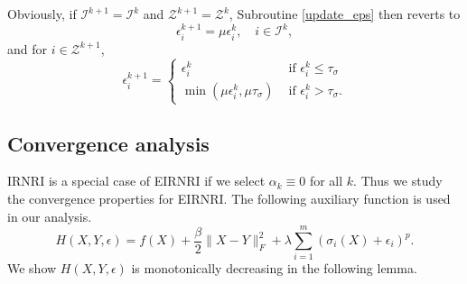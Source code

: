 \documentclass[twoside,11pt]{article}
\newcommand{\Ical}{\mathcal{I}}
\newcommand{\Zcal}{\mathcal{Z}}
\numberwithin{equation}{section}
\begin{document}
Obviously, if $\Ical^{k+1} = \Ical^k $ and $  \Zcal^{k+1} = \Zcal^k $, 
   Subroutine \eqref{update_eps} then reverts to 
    \begin{equation} \label{update.reverts1} 
     \epsilon_{i}^{k+1} = \mu \epsilon_i^k, \quad  i \in \Ical^k, 
     \end{equation} 
     and for $i\in \Zcal^{k+1}$,    
      \begin{equation} \label{update.reverts2} 
       \epsilon_{i}^{k+1} = 
   \begin{cases} \epsilon_i^k  & \text{ if } \epsilon_i^k \le \tau_\sigma \\
                        \min(\mu\epsilon_i^k,\mu\tau_\sigma)  & \text{ if } \epsilon_i^k > \tau_\sigma. 
                      \end{cases}   
     \end{equation}
 






\subsection{Convergence analysis}
 IRNRI is a special case of EIRNRI if we select $\alpha_{k}\equiv 0$ for all $k$. Thus we study the convergence properties for EIRNRI.
 The following auxiliary function is used in our analysis.  
\begin{equation}\label{pro_prox}
  H (X,Y,\epsilon ) = f(X) + \frac{\beta}{2}\|X-Y\|_{F}^{2} +   \lambda\sum_{i=1}^{m} (\sigma_{i} (X)+\epsilon_{i})^{p}.
\end{equation}
We show $  H (X,Y,\epsilon )$ is monotonically decreasing in the following lemma. 
\end{document}

